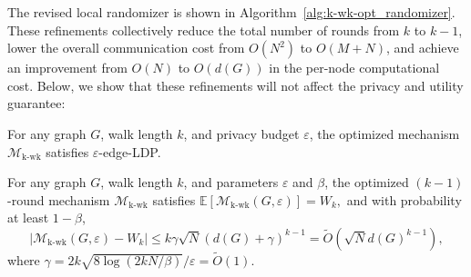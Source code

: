 The revised local randomizer is shown in Algorithm~\ref{alg:k-wk-opt_randomizer}.
These refinements collectively reduce the total number of rounds from $k$ to $k-1$, lower the overall communication cost from $O(N^2)$ to $O(M+N)$, and achieve an
improvement from $O(N)$ to $O(d(G))$ in the per-node computational cost.
Below, we show that these refinements will not affect the privacy and utility guarantee:
\begin{theorem}
For any graph $G$, walk length $k$, and privacy budget $\varepsilon$, the optimized mechanism $\mathcal{M}_{\mathrm{k\text{-}wk}}$ satisfies $\varepsilon$-edge-LDP.
\end{theorem}


\begin{theorem}
For any graph $G$, walk length $k$, and parameters $\varepsilon$ and $\beta$, the optimized $(k-1)$-round mechanism $\mathcal{M}_{\mathrm{k\text{-}wk}}$ satisfies
$
     \mathbb{E}[\mathcal{M}_{\mathrm{k\text{-}wk}}(G,\varepsilon)] = {W}_k,
$
and with probability at least $1 - \beta$,
\begin{equation*}
|\mathcal{M}_{\mathrm{k\text{-}wk}}(G,\varepsilon) - {W}_k|
  \leq  k\gamma \sqrt{N} (d(G) + \gamma)^{k-1} = \tilde{O}(\sqrt{N}d(G)^{k-1}),
\end{equation*}
where $\gamma = 2k\sqrt{8\log(2kN/\beta)}/\varepsilon = \tilde{O}(1)$.  
\end{theorem}










